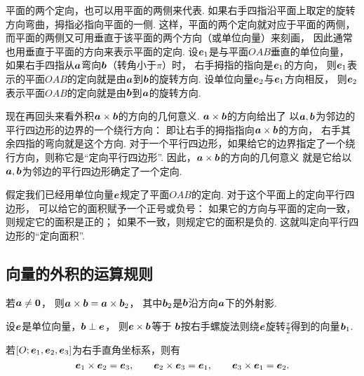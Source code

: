 平面的两个定向，也可以用平面的两侧来代表.
如果右手四指沿平面上取定的旋转方向弯曲，拇指必指向平面的一侧.
这样，平面的两个定向就对应于平面的两侧，
而平面的两侧又可用垂直于该平面的两个方向（或单位向量）来刻画，
因此通常也用垂直于平面的方向来表示平面的定向.
设\(\boldsymbol{e}_1\)是与平面\(OAB\)垂直的单位向量，
如果右手四指从\(\boldsymbol{a}\)弯向\(\boldsymbol{b}\)（转角小于\(\pi\)）时，
右手拇指的指向是\(\boldsymbol{e}_1\)的方向，
则\(\boldsymbol{e}_1\)表示的平面\(OAB\)的定向就是由\(\boldsymbol{a}\)到\(\boldsymbol{b}\)的旋转方向.
设单位向量\(\boldsymbol{e}_2\)与\(\boldsymbol{e}_1\)方向相反，
则\(\boldsymbol{e}_2\)表示平面\(OAB\)的定向就是由\(\boldsymbol{b}\)到\(\boldsymbol{a}\)的旋转方向.

现在再回头来看外积\(\boldsymbol{a}\times\boldsymbol{b}\)的方向的几何意义.
\(\boldsymbol{a}\times\boldsymbol{b}\)的方向给出了
以\(\boldsymbol{a},\boldsymbol{b}\)为邻边的平行四边形的边界的一个绕行方向：
即让右手的拇指指向\(\boldsymbol{a}\times\boldsymbol{b}\)的方向，
右手其余四指的弯向就是这个方向.
对于一个平行四边形，如果给它的边界指定了一个绕行方向，则称它是“定向平行四边形”.
因此，\(\boldsymbol{a}\times\boldsymbol{b}\)的方向的几何意义
就是它给以\(\boldsymbol{a},\boldsymbol{b}\)为邻边的平行四边形确定了一个定向.

假定我们已经用单位向量\(\boldsymbol{e}\)规定了平面\(OAB\)的定向.
对于这个平面上的定向平行四边形，
可以给它的面积赋予一个正号或负号：
如果它的方向与平面的定向一致，则规定它的面积是正的；
如果不一致，则规定它的面积是负的.
这就叫定向平行四边形的“定向面积”.

\subsection{向量的外积的运算规则}
\begin{theorem}
若\(\boldsymbol{a}\neq\boldsymbol{0}\)，
则\(\boldsymbol{a}\times\boldsymbol{b}=\boldsymbol{a}\times\boldsymbol{b}_2\)，
其中\(\boldsymbol{b}_2\)是\(\boldsymbol{b}\)沿方向\(\boldsymbol{a}\)下的外射影.
\end{theorem}

\begin{theorem}
设\(\boldsymbol{e}\)是单位向量，\(\boldsymbol{b}\perp\boldsymbol{e}\)，
则\(\boldsymbol{e}\times\boldsymbol{b}\)等于
\(\boldsymbol{b}\)按右手螺旋法则绕\(\boldsymbol{e}\)旋转\(\frac{\pi}{2}\)得到的向量\(\boldsymbol{b}_1\).
\end{theorem}

\begin{corollary}
若\([O;\boldsymbol{e}_1,\boldsymbol{e}_2,\boldsymbol{e}_3]\)为右手直角坐标系，则有\[
	\boldsymbol{e}_1 \times \boldsymbol{e}_2 = \boldsymbol{e}_3, \qquad
	\boldsymbol{e}_2 \times \boldsymbol{e}_3 = \boldsymbol{e}_1, \qquad
	\boldsymbol{e}_3 \times \boldsymbol{e}_1 = \boldsymbol{e}_2.
\]
\end{corollary}

